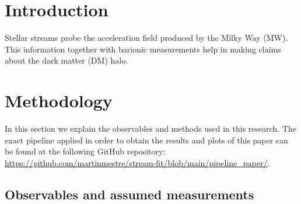 \documentclass[twocolumn]{aa}
\begin{document}
   \maketitle

\section{Introduction}

Stellar streams probe the acceleration field produced by the Milky Way (MW).
This information together with barionic measurements help in making claims about the
dark matter (DM) halo.

\section{Methodology}
In this section we explain the observables and methods used in this research.
The exact pipeline applied in order to obtain the results and plots of this paper
can be found at the following GitHub repository:
\url{https://github.com/martinmestre/stream-fit/blob/main/pipeline_paper/}.

\subsection{Observables and assumed measurements}
\label{sec:observables}
\end{document}
